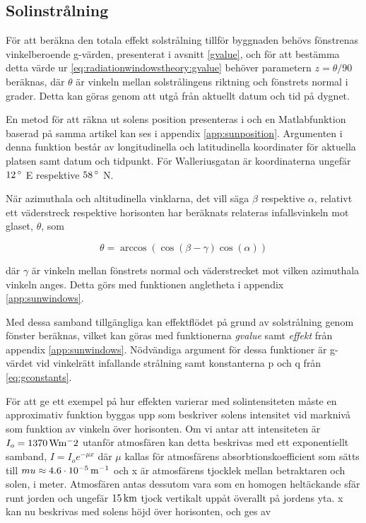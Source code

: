 \subsection{Solinstrålning}
För att beräkna den totala effekt solstrålning tillför byggnaden behövs fönstrenas vinkelberoende g-värden, presenterat i avsnitt \ref{gvalue}, och för att bestämma detta värde ur \eqref{eq:radiationwindowstheory:gvalue} behöver parametern $z = \theta/90$ beräknas, där $\theta$ är vinkeln mellan solstrålingens riktning och fönstrets normal i grader. Detta kan göras genom att utgå från aktuellt datum och tid på dygnet.

En metod för att räkna ut solens position presenteras i \cite{walraven78} och en Matlabfunktion baserad på samma artikel kan ses i appendix \ref{app:sunposition}. Argumenten i denna funktion består av longitudinella och latitudinella koordinater för aktuella platsen samt datum och tidpunkt. För Walleriusgatan är koordinaterna ungefär $\unit[12]{^\circ}$ E respektive $\unit[58]{^\circ}$ N.

När azimuthala och altitudinella vinklarna, det vill säga $\beta$ respektive $\alpha$, relativt ett väderstreck respektive horisonten har beräknats relateras infallsvinkeln mot glaset, $\theta$, som

\begin{equation} 
\theta = \arccos{\left( \cos{\left(\beta - \gamma\right)}\cos{\left(\alpha\right)}\right)}
\end{equation}

där $\gamma$ är vinkeln mellan fönstrets normal och väderstrecket mot vilken azimuthala vinkeln anges. Detta görs med funktionen angletheta i appendix \ref{app:sunwindows}.

Med dessa samband tillgängliga kan effektflödet på grund av solstrålning genom fönster beräknas, vilket kan göras med funktionerna \textit{gvalue} samt \textit{effekt} från appendix \ref{app:sunwindows}. Nödvändiga argument för dessa funktioner är g-värdet vid vinkelrätt infallande strålning samt konstanterna p och q från \eqref{eq:gconstants}. %

För att ge ett exempel på hur effekten varierar med solintensiteten måste en approximativ funktion byggas upp som beskriver solens intensitet vid marknivå som funktion av vinkeln över horisonten. Om vi antar att intensiteten är $I_o = \unit[1370]{Wm^-2}$ utanför atmosfären kan detta beskrivas med ett exponentiellt samband, $I = I_oe^{-\mu x}$ där $\mu$ kallas för atmosfärens absorbtionskoefficient som sätts till $mu\approx \unit[4.6\cdot 10^{-5}]{m^{-1}}$ och x är atmosfärens tjocklek mellan betraktaren och solen, i meter. Atmosfären antas dessutom vara som en homogen heltäckande sfär runt jorden och ungefär $\unit[15]{km}$ tjock vertikalt uppåt överallt på jordens yta. x kan nu beskrivas med solens höjd över horisonten, och ges av

